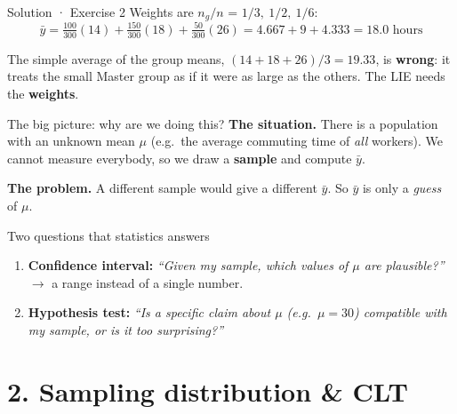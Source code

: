\documentclass[
  11pt,
  ignorenonframetext,
  aspectratio=169,
]{beamer}
\providecommand{\tightlist}{%
  \setlength{\itemsep}{0pt}\setlength{\parskip}{0pt}}
\begin{document}
\begin{frame}{Solution · Exercise 2}
\protect{}\label{solution-exercise-2}
Weights are \(n_g/n\) = \(1/3,\ 1/2,\ 1/6\):
\[\bar y=\tfrac{100}{300}(14)+\tfrac{150}{300}(18)+\tfrac{50}{300}(26)=4.667+9+4.333=\mathbf{18.0}\text{ hours}\]

The simple average of the group means, \((14+18+26)/3=19.33\), is
\textbf{wrong}: it treats the small Master group as if it were as large
as the others. The LIE needs the \textbf{weights}.
\end{frame}

\begin{frame}{The big picture: why are we doing this?}
\protect{}\label{the-big-picture-why-are-we-doing-this}
\textbf{The situation.} There is a population with an unknown mean
\(\mu\) (e.g.~the average commuting time of \emph{all} workers). We
cannot measure everybody, so we draw a \textbf{sample} and compute
\(\bar y\).

\textbf{The problem.} A different sample would give a different
\(\bar y\). So \(\bar y\) is only a \emph{guess} of \(\mu\).

\begin{block}{Two questions that statistics answers}
\protect{}\label{two-questions-that-statistics-answers}
\begin{enumerate}
\tightlist
\item
  \textbf{Confidence interval:} \emph{``Given my sample, which values of
  \(\mu\) are plausible?''} \(\to\) a range instead of a single number.
\item
  \textbf{Hypothesis test:} \emph{``Is a specific claim about \(\mu\)
  (e.g.~\(\mu=30\)) compatible with my sample, or is it too
  surprising?''}
\end{enumerate}
\end{block}
\end{frame}


\section{2. Sampling distribution \&
CLT}\label{sampling-distribution-clt}
\end{document}
